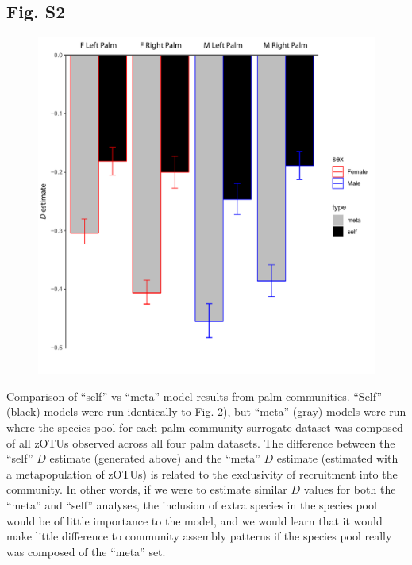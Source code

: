 \documentclass{article}
\begin{document}
{\subsection{Fig. S2}\label{sec:figureS2}
\begin{figure}[ht]
	\centering
	\includegraphics[scale=0.80]{figs/Fig_S2.pdf}
\end{figure}
Comparison of “self” vs “meta” model results from palm communities. “Self” (black) models were run identically to \hyperref[sec:figure2]{Fig. 2}), but “meta” (gray) models were run where the species pool for each palm community surrogate dataset was composed of all zOTUs observed across all four palm datasets. The difference between the “self” \(D\) estimate (generated above) and the “meta” \(D\) estimate (estimated with a metapopulation of zOTUs) is related to the exclusivity of recruitment into the community. In other words, if we were to estimate similar \(D\) values for both the “meta” and “self” analyses, the inclusion of extra species in the species pool would be of little importance to the model, and we would learn that it would make little difference to community assembly patterns if the species pool really was composed of the “meta” set.
\newpage

}
\end{document}
